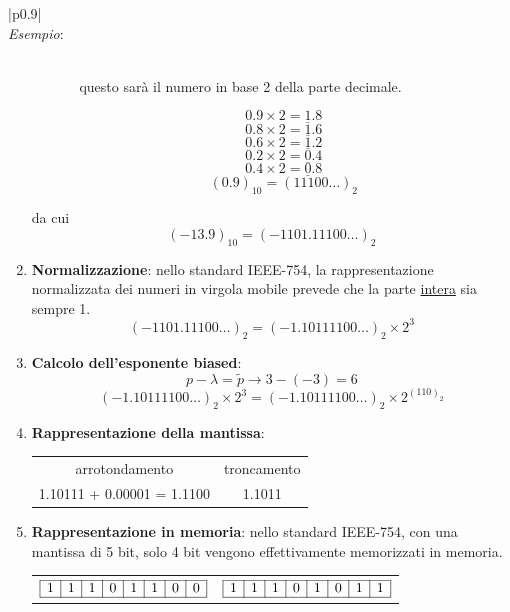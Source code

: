 \documentclass{article}
\newenvironment{example}
{\begin{center}
        \begin{tabular}{|p{0.9\textwidth}|}
            \hline \\ 
            \textit{Esempio}: \\\\ 
        }
        {
            \\\\ \hline
        \end{tabular}
    \end{center}
}
\begin{document}
\begin{example}
\begin{enumerate}
\begin{itemize}
\begin{enumerate}
                            questo sarà il numero in base 2 della parte
                            decimale.
                    \end{enumerate}
                    $$0.9\times2=\underline{1}.8$$
                    $$0.8\times2=\underline{1}.6$$
                    $$0.6\times2=\underline{1}.2$$
                    $$0.2\times2=\underline{0}.4$$
                    $$0.4\times2=\underline{0}.8$$
                    $$(0.9)_{10}=(11100\ldots)_2$$
            \end{itemize}
            da cui
            $$(-13.9)_{10}=(-1101.11100\ldots)_2$$
        \item \textbf{Normalizzazione}:
        nello standard IEEE-754, la rappresentazione normalizzata dei numeri
        in virgola mobile prevede che la parte \underline{intera} sia sempre
        1.
            $$(-1101.11100\ldots)_2=(-1.10111100\ldots)_2\times2^{3}$$
        \item \textbf{Calcolo dell'esponente biased}:
            $$p-\lambda=\tilde{p}\rightarrow3-(-3)=6$$
            $$(-1.10111100\ldots)_2\times2^3=(-1.10111100\ldots)_2\times2^{(110)_2}$$
        \item \textbf{Rappresentazione della mantissa}:
            \begin{center}
               \begin{tabular}{cc}
                    arrotondamento & troncamento \\ 
                   1.10111 + 0.00001 = 1.1100 & 1.1011
               \end{tabular} 
            \end{center}
        \item \textbf{Rappresentazione in memoria}: nello standard IEEE-754,
        con una mantissa di 5 bit, solo 4 bit vengono effettivamente memorizzati in memoria.
        \begin{center}
           \begin{tabular}{cc}
               $
               \begin{array}{|c|c|c|c|c|c|c|c|}
                   \hline
                   1 & 1 & 1 & 0 & 1 & 1 & 0 & 0\\
                   \hline
               \end{array} 
               $ 
                &
                $
                \begin{array}{|c|c|c|c|c|c|c|c|}
                    \hline
                    1 & 1 & 1 & 0 & 1 & 0 & 1 & 1 \\
                    \hline
                \end{array}
                $
           \end{tabular} 
        \end{center}
    \end{enumerate}
\end{example}
\end{document}
